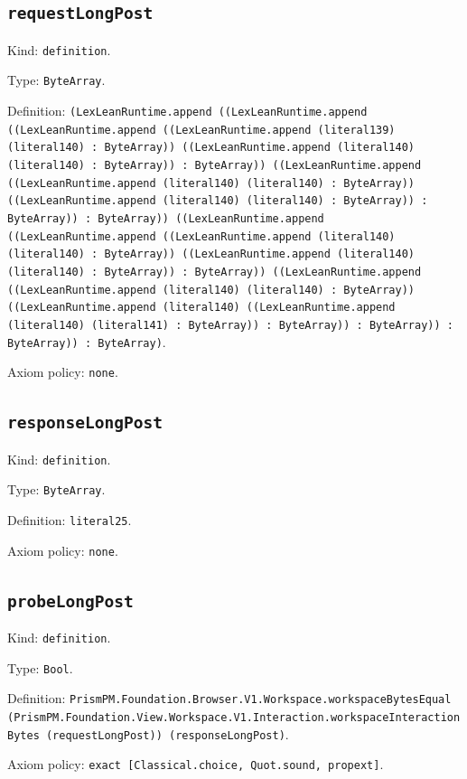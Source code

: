 \documentclass[11pt]{article}
\begin{document}
\subsection*{\texttt{requestLongPost}}
\noindent Kind: \texttt{definition}.\par
\noindent Type: \texttt{ByteArray}.\par
\noindent Definition: \texttt{(LexLeanRuntime.append ((LexLeanRuntime.append ((LexLeanRuntime.append ((LexLeanRuntime.append (literal139) (literal140) : ByteArray)) ((LexLeanRuntime.append (literal140) (literal140) : ByteArray)) : ByteArray)) ((LexLeanRuntime.append ((LexLeanRuntime.append (literal140) (literal140) : ByteArray)) ((LexLeanRuntime.append (literal140) (literal140) : ByteArray)) : ByteArray)) : ByteArray)) ((LexLeanRuntime.append ((LexLeanRuntime.append ((LexLeanRuntime.append (literal140) (literal140) : ByteArray)) ((LexLeanRuntime.append (literal140) (literal140) : ByteArray)) : ByteArray)) ((LexLeanRuntime.append ((LexLeanRuntime.append (literal140) (literal140) : ByteArray)) ((LexLeanRuntime.append (literal140) ((LexLeanRuntime.append (literal140) (literal141) : ByteArray)) : ByteArray)) : ByteArray)) : ByteArray)) : ByteArray)}.\par
\noindent Axiom policy: \texttt{none}.\par
\subsection*{\texttt{responseLongPost}}
\noindent Kind: \texttt{definition}.\par
\noindent Type: \texttt{ByteArray}.\par
\noindent Definition: \texttt{literal25}.\par
\noindent Axiom policy: \texttt{none}.\par
\subsection*{\texttt{probeLongPost}}
\noindent Kind: \texttt{definition}.\par
\noindent Type: \texttt{Bool}.\par
\noindent Definition: \texttt{PrismPM.Foundation.Browser.V1.Workspace.workspaceBytesEqual (PrismPM.Foundation.View.Workspace.V1.Interaction.workspaceInteractionBytes (requestLongPost)) (responseLongPost)}.\par
\noindent Axiom policy: \texttt{exact [Classical.choice, Quot.sound, propext]}.\par
\end{document}
